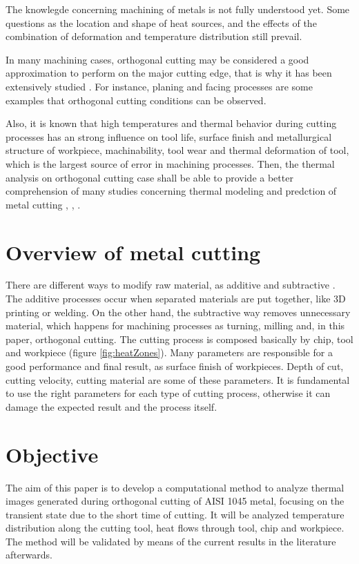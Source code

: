 	The knowlegde concerning machining of metals is not fully understood yet. Some questions as the location and shape of heat sources, and the effects of the combination of deformation and temperature distribution still prevail.

	In many machining cases, orthogonal cutting may be considered a good approximation to perform on the major cutting edge, that is why it has been extensively studied \cite{shaw2005metal}. For instance, planing and facing processes are some examples that orthogonal cutting conditions can be observed.

	Also, it is known that high temperatures and thermal behavior during cutting processes has an strong influence on tool life, surface finish and metallurgical structure of workpiece, machinability, tool wear and thermal deformation of tool, which is the largest source of error in machining processes. Then, the thermal analysis on orthogonal cutting case shall be able to provide a better comprehension of many studies concerning thermal modeling and predction of metal cutting \cite{komanduri2000thermal}, \cite{komanduri2001thermal}, \cite{abukhshim2006heat}.
	
	\section{Overview of metal cutting}
	
	There are different ways to modify raw material, as additive and subtractive \cite{shaw2005metal}. The additive processes occur when separated materials are put together, like 3D printing or welding. On the other hand, the subtractive way removes unnecessary material, which happens for machining processes as turning, milling and, in this paper, orthogonal cutting. The cutting process is composed basically by chip, tool and workpiece (figure \ref{fig:heatZones}).
	Many parameters are responsible for a good performance and final result, as surface finish of workpieces. Depth of cut, cutting velocity, cutting material are some of these parameters. It is fundamental to use the right parameters for each type of cutting process, otherwise it can damage the expected result and the process itself.
	
	\section{Objective}

	The aim of this paper is to develop a computational method to analyze thermal images generated during orthogonal cutting of AISI 1045 metal, focusing on the transient state due to the short time of cutting. It will be analyzed temperature distribution along the cutting tool, heat flows through tool, chip and workpiece. The method will be validated by means of the current results in the literature afterwards.

